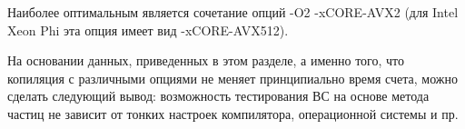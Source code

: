 Наиболее оптимальным является сочетание опций -O2 -xCORE-AVX2 (для Intel Xeon Phi эта опция имеет вид -xCORE-AVX512).

На основании данных, приведенных в этом разделе, а именно того, что копиляция с различными опциями не меняет принципиально время счета, можно сделать следующий вывод: возможность тестирования ВС на основе метода частиц не зависит от тонких настроек компилятора, операционной системы и пр.  

